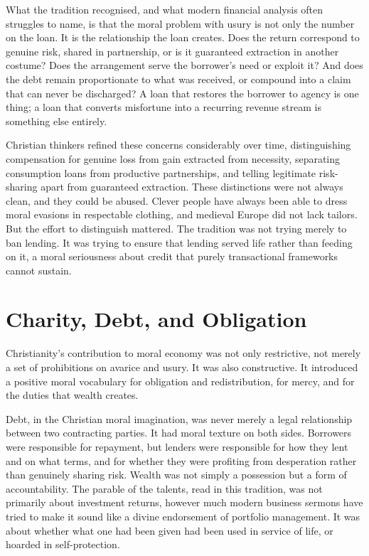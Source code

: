 \documentclass[11pt,a4paper,oneside]{book}
\begin{document}
What the tradition recognised, and what modern financial analysis often struggles to name, is that the moral problem with usury is not only the number on the loan. It is the relationship the loan creates. Does the return correspond to genuine risk, shared in partnership, or is it guaranteed extraction in another costume? Does the arrangement serve the borrower's need or exploit it? And does the debt remain proportionate to what was received, or compound into a claim that can never be discharged? A loan that restores the borrower to agency is one thing; a loan that converts misfortune into a recurring revenue stream is something else entirely.

Christian thinkers refined these concerns considerably over time, distinguishing compensation for genuine loss from gain extracted from necessity, separating consumption loans from productive partnerships, and telling legitimate risk-sharing apart from guaranteed extraction. These distinctions were not always clean, and they could be abused. Clever people have always been able to dress moral evasions in respectable clothing, and medieval Europe did not lack tailors. But the effort to distinguish mattered. The tradition was not trying merely to ban lending. It was trying to ensure that lending served life rather than feeding on it, a moral seriousness about credit that purely transactional frameworks cannot sustain.

\section*{Charity, Debt, and Obligation}

Christianity's contribution to moral economy was not only restrictive, not merely a set of prohibitions on avarice and usury. It was also constructive. It introduced a positive moral vocabulary for obligation and redistribution, for mercy, and for the duties that wealth creates.

Debt, in the Christian moral imagination, was never merely a legal relationship between two contracting parties. It had moral texture on both sides. Borrowers were responsible for repayment, but lenders were responsible for how they lent and on what terms, and for whether they were profiting from desperation rather than genuinely sharing risk. Wealth was not simply a possession but a form of accountability. The parable of the talents, read in this tradition, was not primarily about investment returns, however much modern business sermons have tried to make it sound like a divine endorsement of portfolio management. It was about whether what one had been given had been used in service of life, or hoarded in self-protection.
\end{document}
